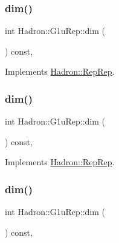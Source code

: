 \subsubsection{\texorpdfstring{dim()}{dim()}\hspace{0.1cm}{\footnotesize\ttfamily [1/5]}}
{\footnotesize\ttfamily int Hadron\+::\+G1u\+Rep\+::dim (\begin{DoxyParamCaption}{ }\end{DoxyParamCaption}) const\hspace{0.3cm}{\ttfamily [inline]}, {\ttfamily [virtual]}}



Implements \mbox{\hyperlink{structHadron_1_1RepRep_a92c8802e5ed7afd7da43ccfd5b7cd92b}{Hadron\+::\+Rep\+Rep}}.

\mbox{\label{structHadron_1_1G1uRep_a13d30ff40203d77d9beacee3e48dbbd7}} 
\subsubsection{\texorpdfstring{dim()}{dim()}\hspace{0.1cm}{\footnotesize\ttfamily [2/5]}}
{\footnotesize\ttfamily int Hadron\+::\+G1u\+Rep\+::dim (\begin{DoxyParamCaption}{ }\end{DoxyParamCaption}) const\hspace{0.3cm}{\ttfamily [inline]}, {\ttfamily [virtual]}}



Implements \mbox{\hyperlink{structHadron_1_1RepRep_a92c8802e5ed7afd7da43ccfd5b7cd92b}{Hadron\+::\+Rep\+Rep}}.

\mbox{\label{structHadron_1_1G1uRep_a13d30ff40203d77d9beacee3e48dbbd7}} 
\subsubsection{\texorpdfstring{dim()}{dim()}\hspace{0.1cm}{\footnotesize\ttfamily [3/5]}}
{\footnotesize\ttfamily int Hadron\+::\+G1u\+Rep\+::dim (\begin{DoxyParamCaption}{ }\end{DoxyParamCaption}) const\hspace{0.3cm}{\ttfamily [inline]}, {\ttfamily [virtual]}}



